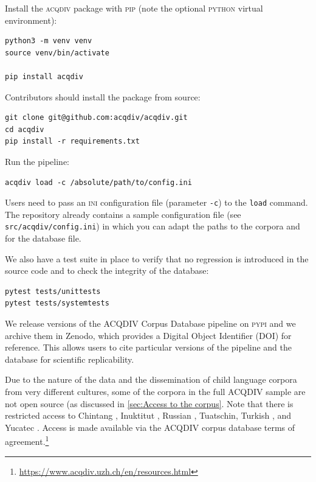 \documentclass[a4paper, 11pt]{book}
\begin{document}
Install the \textsc{acqdiv} package with \textsc{pip} (note the optional \textsc{python} virtual environment):

\begin{verbatim}
python3 -m venv venv
source venv/bin/activate

pip install acqdiv
\end{verbatim}


Contributors should install the package from source:

\begin{verbatim}
git clone git@github.com:acqdiv/acqdiv.git
cd acqdiv
pip install -r requirements.txt
\end{verbatim}


Run the pipeline:

\begin{verbatim}
acqdiv load -c /absolute/path/to/config.ini
\end{verbatim}


Users need to pass an \textsc{ini} configuration file (parameter \texttt{-c}) to the \texttt{load} command. The repository already contains a sample configuration file (see \texttt{src/acqdiv/config.ini}) in which you can adapt the paths to the corpora and for the database file.

We also have a test suite in place to verify that no regression is introduced in the source code and to check the integrity of the database:

\begin{verbatim}
pytest tests/unittests
pytest tests/systemtests
\end{verbatim}

We release versions of the ACQDIV Corpus Database pipeline on \textsc{pypi} and we archive them in Zenodo, which provides a Digital Object Identifier (DOI) for reference. This allows users to cite particular versions of the pipeline and the database for scientific replicability.

Due to the nature of the data and the dissemination of child language corpora from very different cultures, some of the corpora in the full ACQDIV sample are not open source (as discussed in \autoref{sec:Access to the corpus}. Note that there is restricted access to Chintang \citep{Stoll_etal2015b-unpublished}, Inuktitut \citep{Allen2015a}, Russian \citep{Stoll_etal2008a}, Tuatschin, Turkish \citep{Kuntay2015a}, and Yucatec \citep{Pfeiler2015a}. Access is made available via the ACQDIV corpus database terms of agreement.\footnote{\url{https://www.acqdiv.uzh.ch/en/resources.html}}
\end{document}
